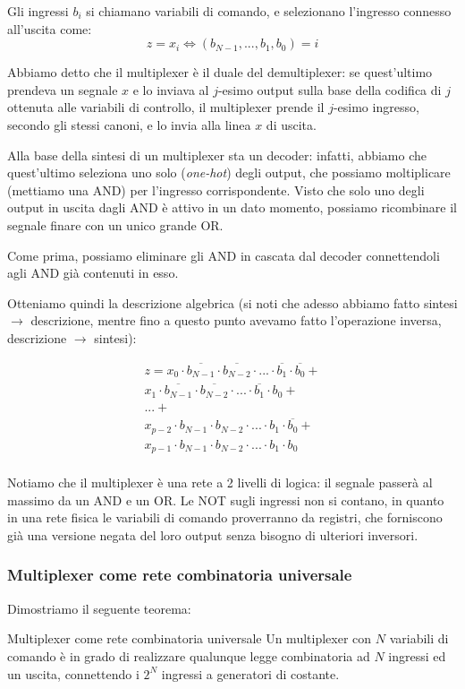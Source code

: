 \documentclass[a4paper,11pt]{article}
\begin{document}
Gli ingressi $b_i$ si chiamano variabili di comando, e selezionano l'ingresso connesso all'uscita come:
$$
z = x_i \Leftrightarrow (b_{N-1}, ..., b_1, b_0) = i
$$

Abbiamo detto che il multiplexer è il duale del demultiplexer: se quest'ultimo prendeva un segnale $x$ e lo inviava al $j$-esimo output sulla base della codifica di $j$ ottenuta alle variabili di controllo, il multiplexer prende il $j$-esimo ingresso, secondo gli stessi canoni, e lo invia alla linea $x$ di uscita.

Alla base della sintesi di un multiplexer sta un decoder: infatti, abbiamo che quest'ultimo seleziona uno solo (\textit{one-hot}) degli output, che possiamo moltiplicare (mettiamo una AND) per l'ingresso corrispondente.
Visto che solo uno degli output in uscita dagli AND è attivo in un dato momento, possiamo ricombinare il segnale finare con un unico grande OR.

Come prima, possiamo eliminare gli AND in cascata dal decoder connettendoli agli AND già contenuti in esso.

Otteniamo quindi la descrizione algebrica (si noti che adesso abbiamo fatto sintesi $\rightarrow$ descrizione, mentre fino a questo punto avevamo fatto l'operazione inversa, descrizione $\rightarrow$ sintesi):

\[
	\begin{aligned}
		z = x_0 \cdot \overline{b_{N-1}} \cdot \overline{b_{N-2}} \cdot ... \cdot \overline{b_1} \cdot \overline{b_0}	+ \\
		x_1 \cdot \overline{b_{N-1}} \cdot \overline{b_{N-2}} \cdot ... \cdot \overline{b_1} \cdot b_0	+\\
		... + \\
		x_{p-2} \cdot b_{N-1} \cdot b_{N-2} \cdot ... \cdot b_1 \cdot \overline{b_0}	+\\
		x_{p-1} \cdot b_{N-1} \cdot b_{N-2} \cdot ... \cdot b_1 \cdot b_0	\\
	\end{aligned}
\]

Notiamo che il multiplexer è una rete a 2 livelli di logica: il segnale passerà al massimo da un AND e un OR.
Le NOT sugli ingressi non si contano, in quanto in una rete fisica le variabili di comando proverranno da registri, che forniscono già una versione negata del loro output senza bisogno di ulteriori inversori.

\subsubsection{Multiplexer come rete combinatoria universale}
Dimostriamo il seguente teorema:
\begin{theorem}{Multiplexer come rete combinatoria universale}	
Un multiplexer con $N$ variabili di comando è in grado di realizzare qualunque legge combinatoria ad $N$ ingressi ed un uscita, connettendo i $2^N$ ingressi a generatori di costante.
\end{theorem}
\end{document}
